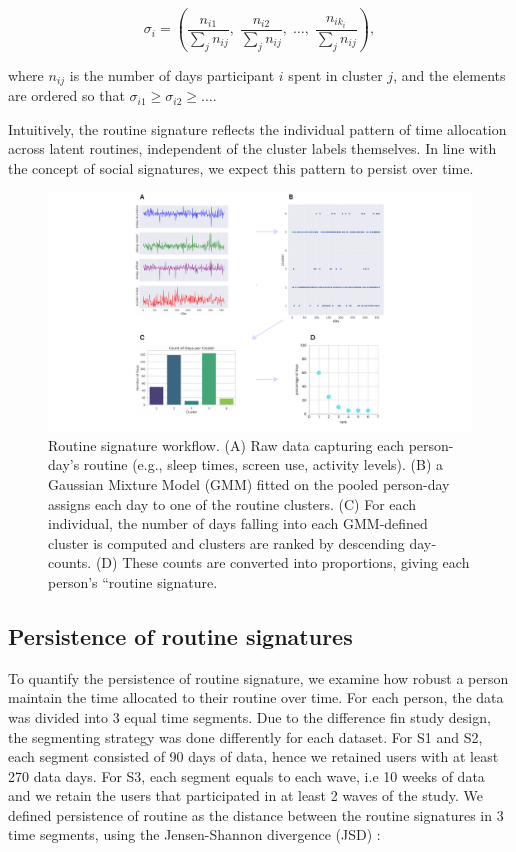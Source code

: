 \documentclass[pdflatex,sn-vancouver,Numbered]{bst/sn-jnl}%
\theoremstyle{thmstyleone}%
\theoremstyle{thmstyletwo}%
\theoremstyle{thmstylethree}%
\begin{document}
\begin{equation}
    \sigma_i = \left(
    \frac{n_{i1}}{\sum_j n_{ij}},\;
    \frac{n_{i2}}{\sum_j n_{ij}},\;
    \ldots,\;
    \frac{n_{ik_i}}{\sum_j n_{ij}}
    \right),
\end{equation}

where \(n_{ij}\) is the number of days participant \(i\) spent in cluster \(j\), and the elements are ordered so that \(\sigma_{i1} \geq \sigma_{i2} \geq \dots\).  

Intuitively, the routine signature reflects the individual pattern of time allocation across latent routines, independent of the cluster labels themselves. In line with the concept of social signatures, we expect this pattern to persist over time.


\begin{figure}[!htbp]
    \centering
    \includegraphics[width=\textwidth]{figures/workflow.pdf}
    \caption{Routine signature workflow. (A) Raw data capturing each person-day’s routine (e.g., sleep times, screen use, activity levels).
(B) a Gaussian Mixture Model (GMM) fitted on the pooled person-day assigns each day to one of the routine clusters.
(C) For each individual, the number of days falling into each GMM‐defined cluster is computed and clusters are ranked by descending day‐counts.
(D) These counts are converted into proportions, giving each person’s “routine signature.}
    \label{fig:routine-sig-workflow}
\end{figure}

\subsection*{Persistence of routine signatures}\label{sec:methods:signature_persistence}  

To quantify the persistence of routine signature, we examine how robust a person maintain the time allocated to their routine over time. For each person, the data was divided into 3 equal time segments. Due to the difference fin study design, the segmenting strategy was done differently for each dataset. For S1 and S2, each segment consisted of 90 days of data, hence we retained users with at least 270 data days. For S3, each segment equals to each wave, i.e 10 weeks of data and we retain the users that participated in at least 2 waves of the study. We defined persistence of routine as the distance between the routine signatures in 3 time segments, using the Jensen-Shannon divergence (JSD) \cite{lin1991divergence}:
\end{document}
